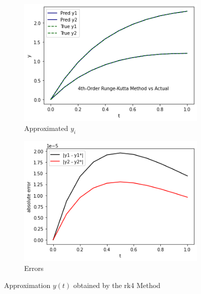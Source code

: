 \documentclass[12pt,oneside]{book}
\begin{document}
		\begin{figure}[h!]
			\centering
			\begin{subfigure}[h]{0.47\textwidth}
				\centering
				\includegraphics[width=\textwidth]{rk4}
				\caption{Approximated $ y_{i} $}
			\end{subfigure}
			\hfill
			\begin{subfigure}[h]{0.47\textwidth}
				\centering
				\includegraphics[width=\textwidth]{rk4_err}
				\caption{Errors}
			\end{subfigure}
			\caption{Approximation $ y(t) $ obtained by the \ac{rk4} Method}
			\label{fig:rk4}
		\end{figure}
	
\end{document}
